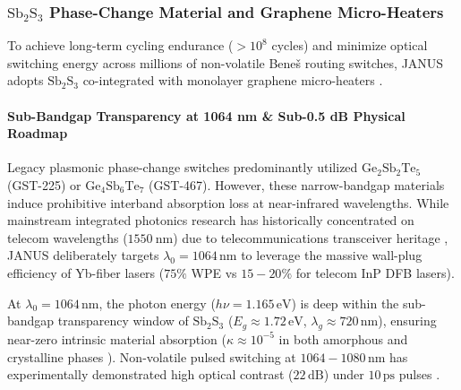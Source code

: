 \documentclass[journal]{IEEEtran}
\begin{document}
\subsubsection{\textbf{$\mathrm{Sb_2S_3}$ Phase-Change Material and Graphene Micro-Heaters}}

To achieve long-term cycling endurance ($> 10^8$ cycles) and minimize optical switching energy across millions of non-volatile Bene\v{s} routing switches, JANUS adopts $\mathrm{Sb_2S_3}$ co-integrated with monolayer graphene micro-heaters \cite{Rios2021}.

\paragraph{\textbf{Sub-Bandgap Transparency at 1064 nm \& Sub-0.5 dB Physical Roadmap}}
Legacy plasmonic phase-change switches predominantly utilized $\mathrm{Ge_2Sb_2Te_5}$ (GST-225) or $\mathrm{Ge_4Sb_6Te_7}$ (GST-467). However, these narrow-bandgap materials induce prohibitive interband absorption loss at near-infrared wavelengths. While mainstream integrated photonics research has historically concentrated on telecom wavelengths ($1550~\mathrm{nm}$) due to telecommunications transceiver heritage \cite{Zhou2024,Bao2025}, JANUS deliberately targets $\lambda_0 = 1064\,\mathrm{nm}$ to leverage the massive wall-plug efficiency of Yb-fiber lasers ($75\%$ WPE vs $15-20\%$ for telecom InP DFB lasers).

At $\lambda_0 = 1064\,\mathrm{nm}$, the photon energy ($h\nu = 1.165\,\mathrm{eV}$) is deep within the sub-bandgap transparency window of $\mathrm{Sb_2S_3}$ ($E_g \approx 1.72\,\mathrm{eV}$, $\lambda_g \approx 720\,\mathrm{nm}$), ensuring near-zero intrinsic material absorption ($\kappa \approx 10^{-5}$ in both amorphous and crystalline phases \cite{Delaney2020,Zhang2023MDM}). Non-volatile pulsed switching at $1064-1080\,\mathrm{nm}$ has experimentally demonstrated high optical contrast ($22\,\mathrm{dB}$) under $10\,\mathrm{ps}$ pulses \cite{PerezFrances2023}. 
\end{document}
